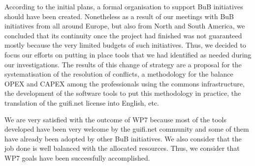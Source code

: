 According to the initial plans, a formal organisation to support BuB initiatives should have been created. Nonetheless as a result of our meetings with BuB initiatives from all around Europe, but also from North and South America, we concluded that its continuity once the project had finished was not guaranteed mostly because the very limited budgets of such initiatives. Thus, we decided to focus our efforts on putting in place tools that we had identified as needed during our investigations. The results of this change of strategy are a proposal for the systematisation of the resolution of conflicts, a methodology for the balance OPEX and CAPEX among the professionals using the commons infrastructure, the development of the software tools to put this methodology in practice, the translation of the guifi.net license into English, etc.

We are very satisfied with the outcome of WP7 because most of the tools developed have been very welcome by the guifi.net community and some of them have already been adopted by other BuB initiatives. We also consider that the job done is well balanced with the allocated resources. Thus, we consider that WP7 goals have been successfully accomplished.
